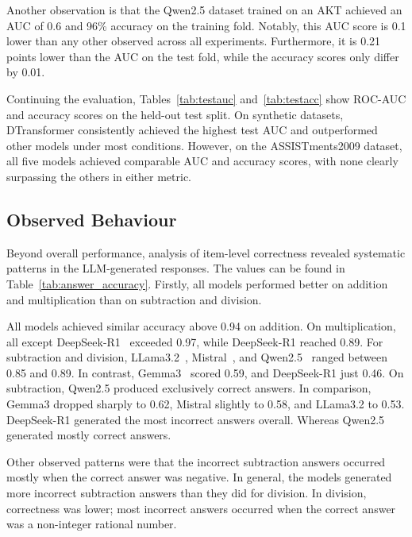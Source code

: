 Another observation is that the Qwen2.5 dataset trained on an AKT achieved an AUC of 0.6 and 96\% accuracy on the training fold. Notably, this AUC score is 0.1 lower than any other observed across all experiments. Furthermore, it is 0.21 points lower than the AUC on the test fold, while the accuracy scores only differ by 0.01.







Continuing the evaluation, Tables~\ref{tab:testauc} and~\ref{tab:testacc} show ROC-AUC and accuracy scores on the held-out test split. On synthetic datasets, DTransformer consistently achieved the highest test AUC and outperformed other models under most conditions. However, on the ASSISTments2009 dataset, all five models achieved comparable AUC and accuracy scores, with none clearly surpassing the others in either metric.




\subsection{Observed Behaviour}

Beyond overall performance, analysis of item-level correctness revealed systematic patterns in the LLM-generated responses. The values can be found in Table~\ref{tab:answer_accuracy}. Firstly, all models performed better on addition and multiplication than on subtraction and division.

All models achieved similar accuracy above 0.94 on addition. On multiplication, all except DeepSeek-R1~\autocite{deepseek-r1} exceeded 0.97, while DeepSeek-R1 reached 0.89. For subtraction and division, LLama3.2~\autocite{llama3}, Mistral~\autocite{mistral7b}, and Qwen2.5~\autocite{qwen2.5} ranged between 0.85 and 0.89. In contrast, Gemma3~\autocite{gemma_2025} scored 0.59, and DeepSeek-R1 just 0.46. On subtraction, Qwen2.5 produced exclusively correct answers. In comparison, Gemma3 dropped sharply to 0.62, Mistral slightly to 0.58, and LLama3.2 to 0.53. DeepSeek-R1 generated the most incorrect answers overall. Whereas Qwen2.5 generated mostly correct answers.

Other observed patterns were that the incorrect subtraction answers occurred mostly when the correct answer was negative. In general, the models generated more incorrect subtraction answers than they did for division. In division, correctness was lower; most incorrect answers occurred when the correct answer was a non-integer rational number.

